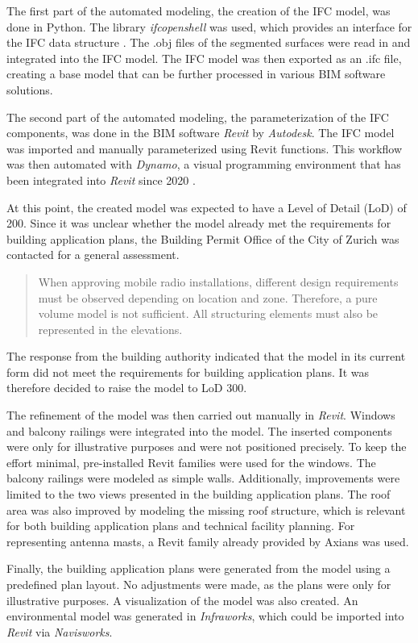\begin{English}
    The first part of the automated modeling, the creation of the IFC model, was done in Python. The library \textit{ifcopenshell} was used, which provides an interface for the IFC data structure \cite{IfcOpenShellOpenSource}. The .obj files of the segmented surfaces were read in and integrated into the IFC model. The IFC model was then exported as an .ifc file, creating a base model that can be further processed in various BIM software solutions.
    
    The second part of the automated modeling, the parameterization of the IFC components, was done in the BIM software \textit{Revit} by \textit{Autodesk}. The IFC model was imported and manually parameterized using Revit functions. This workflow was then automated with \textit{Dynamo}, a visual programming environment that has been integrated into \textit{Revit} since 2020 \cite{DynamoBIM}.
    
    At this point, the created model was expected to have a Level of Detail (LoD) of 200. Since it was unclear whether the model already met the requirements for building application plans, the Building Permit Office of the City of Zurich was contacted for a general assessment.
    
    \begin{quote}
        When approving mobile radio installations, different design requirements must be observed depending on location and zone. Therefore, a pure volume model is not sufficient. All structuring elements must also be represented in the elevations. \cite{amtfurbaubewilligungenthomasfeyerAW_Bachelorarbeit_Anfrage}
    \end{quote}

    The response from the building authority indicated that the model in its current form did not meet the requirements for building application plans. It was therefore decided to raise the model to LoD 300.
    
    The refinement of the model was then carried out manually in \textit{Revit}. Windows and balcony railings were integrated into the model. The inserted components were only for illustrative purposes and were not positioned precisely. To keep the effort minimal, pre-installed Revit families were used for the windows. The balcony railings were modeled as simple walls. Additionally, improvements were limited to the two views presented in the building application plans.
    The roof area was also improved by modeling the missing roof structure, which is relevant for both building application plans and technical facility planning. For representing antenna masts, a Revit family already provided by Axians was used.

    Finally, the building application plans were generated from the model using a predefined plan layout. No adjustments were made, as the plans were only for illustrative purposes. A visualization of the model was also created. An environmental model was generated in \textit{Infraworks}, which could be imported into \textit{Revit} via \textit{Navisworks}.
\end{English}